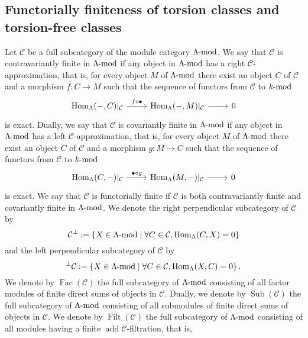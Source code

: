 \documentclass[pdftex,a4paper]{article}
\numberwithin{equation}{subsection}
\theoremstyle{definition}
\newcommand{\setmid}{\; \middle|\;}
\newcommand{\lmod}{\operatorname{\mathrm{\hspace{-2pt}-mod}}}
\newcommand{\Hom}{\operatorname{Hom}\nolimits}
\newcommand{\add}{\operatorname{\mathrm{add}}}
\newcommand{\Fac}{\operatorname{\mathrm{Fac}}}
\newcommand{\Sub}{\operatorname{\mathrm{Sub}}}
\newcommand{\Filt}{\operatorname{\mathrm{Filt}}}
\begin{document}
\subsection{Functorially finiteness of torsion classes and torsion-free classes}\label{pre tors 2021-11-04 11:32:08}
Let \(\mathcal{C}\) be a full subcategory of the module category \(\Lambda \lmod\).
We say that \(\mathcal{C}\) is contravariantly finite in \(\Lambda \lmod\) if any object in \(\Lambda\lmod\) has a right \(\mathcal{C}\)-approximation, that is, for every object \(M\) of \(\Lambda \lmod\) there exist an object \(C\) of \(\mathcal{C}\) and a morphism \(f\colon C\rightarrow M\) such that the sequence of functors from \(\mathcal{C}\) to \(k\lmod\)
\begin{equation}
	\begin{tikzcd}
		\Hom_{\Lambda}(-,C)|_{\mathcal{C}} \ar[r,"f \circ \bullet"]& \Hom_{\Lambda}(-,M)|_{\mathcal{C}} \ar[r]& 0
	\end{tikzcd}
\end{equation}
is exact.
Dually, we say that \(\mathcal{C}\) is covariantly finite in \(\Lambda \lmod\) if any object in \(\Lambda\lmod\) has a left \(\mathcal{C}\)-approximation, that is, for every object \(M\) of \(\Lambda \lmod\) there exist an object \(C\) of \(\mathcal{C}\) and a morphism \(g\colon M\rightarrow C\) such that the sequence of functors from \(\mathcal{C}\) to \(k\lmod\)
\begin{equation}
	\begin{tikzcd}
		\Hom_{\Lambda}(C,-)|_{\mathcal{C}} \ar[r,"\bullet \circ g"]& \Hom_{\Lambda}(M,-)|_{\mathcal{C}} \ar[r]& 0
	\end{tikzcd}
\end{equation}
is exact.
We say that \(\mathcal{C}\) is functorially finite if \(\mathcal{C}\) is both contravariantly finite and covariantly finite in \(\Lambda\lmod\).
We denote the right perpendicular subcategory of \(\mathcal{C}\) by
\begin{equation}
	\mathcal{C}^{\perp}:=\left\{ X \in \Lambda \lmod \setmid \text{\(\forall C \in \mathcal{C}, \Hom_{\Lambda}(C, X) =0\)} \right\}
\end{equation}
and the left perpendicular subcategory of \(\mathcal{C}\) by
\begin{equation}
	{}^{\perp}\mathcal{C}:=\left\{ X \in \Lambda \lmod \setmid \forall C \in \mathcal{C}, \Hom_{\Lambda}(X,C) =0 \right\}.
\end{equation}
We denote by \(\Fac(\mathcal{C})\) the full subcategory of \(\Lambda\lmod\) consisting of all factor modules of finite direct sums of objects in \(\mathcal{C}\).
Dually, we denote by \(\Sub(\mathcal{C})\) the full subcategory of \(\Lambda\lmod\) consisting of all submodules of finite direct sums of objects in \(\mathcal{C}\). We denote by \(\Filt(\mathcal{C})\) the full subcategory of \(\Lambda\lmod\) consisting of all modules having a finite \(\add \mathcal{C}\)-filtration, that is,
\end{document}
